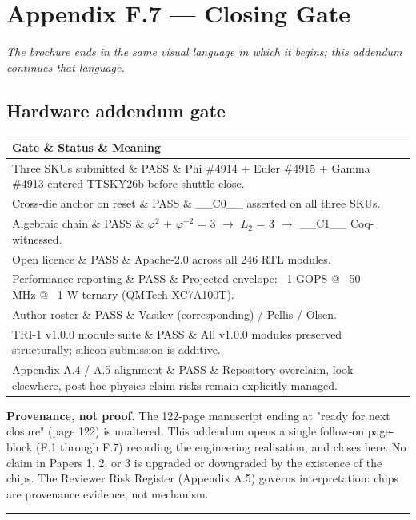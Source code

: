 
\section{Appendix F.7 --- Closing Gate}

\textit{The brochure ends in the same visual language in which it begins; this addendum continues that language.}

\subsection{Hardware addendum gate}

\begin{tabular}{|l|l|l|}
\hline
Gate \& Status \& Meaning \\
\hline
Three SKUs submitted \& PASS \& Phi \#4914 + Euler \#4915 + Gamma \#4913 entered TTSKY26b before shuttle close. \\
Cross-die anchor on reset \& PASS \& \_\_C0\_\_ asserted on all three SKUs. \\
Algebraic chain \& PASS \& $\varphi^{2}$ + $\varphi^{-2}$ = 3 $\rightarrow$ $L_{2}$ = 3 $\rightarrow$ \_\_C1\_\_ Coq-witnessed. \\
Open licence \& PASS \& Apache-2.0 across all 246 RTL modules. \\
Performance reporting \& PASS \& Projected envelope: ~1 GOPS @ ~50 MHz @ ~1 W ternary (QMTech XC7A100T). \\
Author roster \& PASS \& Vasilev (corresponding) / Pellis / Olsen. \\
TRI-1 v1.0.0 module suite \& PASS \& All v1.0.0 modules preserved structurally; silicon submission is additive. \\
Appendix A.4 / A.5 alignment \& PASS \& Repository-overclaim, look-elsewhere, post-hoc-physics-claim risks remain explicitly managed. \\
\hline
\end{tabular}
\textbf{Provenance, not proof.} The 122-page manuscript ending at "ready for next closure" (page 122) is unaltered. This addendum opens a single follow-on page-block (F.1 through F.7) recording the engineering realisation, and closes here. No claim in Papers 1, 2, or 3 is upgraded or downgraded by the existence of the chips. The Reviewer Risk Register (Appendix A.5) governs interpretation: chips are provenance evidence, not mechanism.

\noindent\rule{\textwidth}{0.4pt}

